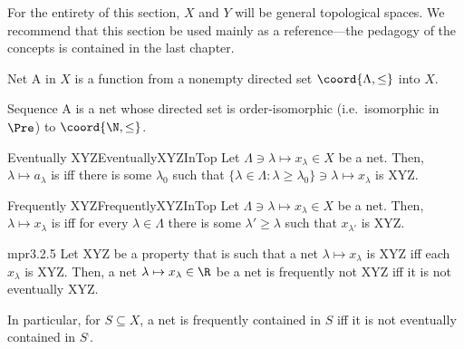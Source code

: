 For the entirety of this section, $X$ and $Y$ will be general topological spaces.  We recommend that this section be used mainly as a reference---the pedagogy of the concepts is contained in the last chapter.
\begin{dfn}{Net}{}
A  in $X$ is a function from a nonempty directed set $\coord{\Lambda ,\leq}$ into $X$.
\end{dfn}
\begin{dfn}{Sequence}{}
A  is a net whose directed set is order-isomorphic (i.e.~isomorphic in $\Pre$) to $\coord{\N ,\leq}$.
\end{dfn}
\begin{mdf}{Eventually XYZ}{EventuallyXYZInTop}
Let $\Lambda \ni \lambda \mapsto x_\lambda \in X$ be a net.  Then, $\lambda \mapsto a_\lambda$ is  iff there is some $\lambda _0$ such that $\{ \lambda \in \Lambda :\lambda \geq \lambda _0\} \ni \lambda \mapsto x_\lambda$ is XYZ.
\end{mdf}
\begin{mdf}{Frequently XYZ}{FrequentlyXYZInTop}
Let $\Lambda \ni \lambda \mapsto x_{\lambda}\in X$ be a net.  Then, $\lambda \mapsto x_{\lambda}$ is  iff for every $\lambda \in \Lambda$ there is some $\lambda '\geq \lambda$ such that $x_{\lambda '}$ is XYZ.
\end{mdf}
\begin{mpr}{}{mpr3.2.5}
Let XYZ be a property that is such that a net $\lambda \mapsto x_{\lambda}$ is XYZ iff each $x_{\lambda}$ is XYZ.  Then, a net $\lambda \mapsto x_{\lambda}\in \R$ be a net is frequently not XYZ iff it is not eventually XYZ.
\begin{rmk}
In particular, for $S\subseteq X$, a net is frequently contained in $S$ iff it is not eventually contained in $S^{\comp}$.
\end{rmk}
\end{mpr}
